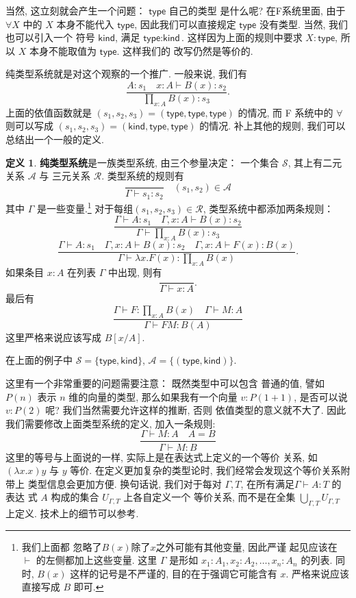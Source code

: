 \documentclass[UTF8]{ctexbook}
\newcommand{\cons}[1]{\textsf{#1}}
\theoremstyle{plain}
\theoremstyle{definition}
\newtheorem{definition}{定义}[chapter]
\theoremstyle{remark}
\begin{document}
当然, 这立刻就会产生一个问题： \(\cons{type}\) 自己的类型
是什么呢? 在F系统里面, 由于 \(\forall X\) 中的 \(X\)
本身不能代入 \(\cons{type}\), 因此我们可以直接规定
\(\cons{type}\) 没有类型. 当然, 我们也可以引入一个
符号 \(\cons{kind}\), 满足 \(\cons{type} : \cons{kind}\).
这样因为上面的规则中要求 \(X : \cons{type}\),
所以 \(X\) 本身不能取值为 \(\cons{type}\). 这样我们的
改写仍然是等价的.

纯类型系统就是对这个观察的一个推广. 一般来说, 我们有
\[\frac{A : s_1 \quad x{:}A \vdash B(x) : s_2}{\prod_{x:A}B(x) : s_3}.\]
上面的依值函数就是 \((s_1,s_2,s_3) = (\cons{type}, \cons{type}, \cons{type})\)
的情况, 而 F 系统中的 \(\forall\) 则可以写成
\((s_1,s_2,s_3) = (\cons{kind}, \cons{type}, \cons{type})\)
的情况. 补上其他的规则, 我们可以总结出一个一般的定义.
\begin{definition}
\textbf{纯类型系统}是一族类型系统, 由三个参量决定：
一个集合 \(\mathcal S\),
其上有二元关系 \(\mathcal A\) 与
三元关系 \(\mathcal R\). 类型系统的规则有
\[\frac{}{\Gamma\vdash s_1 : s_2} \quad (s_1, s_2) \in \mathcal A\]
其中 \(\Gamma\) 是一些变量.\footnote{我们上面都
忽略了\(B(x)\)除了\(x\)之外可能有其他变量, 因此严谨
起见应该在 \(\vdash\) 的左侧都加上这些变量. 这里 \(\Gamma\)
是形如 \(x_1{:}A_1, x_2{:}A_2, \dots, x_n{:}A_n\) 的列表.
同时, \(B(x)\) 这样的记号是不严谨的, 目的在于强调它可能含有 \(x\).
严格来说应该直接写成 \(B\) 即可.}
对于每组\((s_1,s_2,s_3)\in \mathcal R\),
类型系统中都添加两条规则：
\[\frac{\Gamma \vdash A : s_1 \quad \Gamma, x{:}A \vdash B(x) : s_2}{\Gamma \vdash \prod_{x:A} B(x) : s_3}\]
\[\frac{\Gamma \vdash A : s_1 \quad \Gamma, x{:}A \vdash B(x) : s_2\quad
\Gamma, x{:}A \vdash F(x) : B(x)}
{\Gamma \vdash \lambda x. F(x) : \prod_{x:A}B(x)}.\]
如果条目 \(x : A\) 在列表 \(\Gamma\) 中出现, 则有
\[\frac{}{\Gamma \vdash x : A}.\]
最后有
\[\frac{\Gamma \vdash F : \prod_{x:A}B(x) \quad
\Gamma \vdash M : A}{\Gamma \vdash FM : B(A)}\]
这里严格来说应该写成 \(B[x/A]\).
\end{definition}
在上面的例子中 \(\mathcal S = \{\cons{type}, \cons{kind}\}\),
\(\mathcal A = \{(\cons{type}, \cons{kind})\}\).

这里有一个非常重要的问题需要注意： 既然类型中可以包含
普通的值, 譬如 \(P(n)\) 表示 \(n\) 维的向量的类型,
那么如果我有一个向量 \(v : P(1+1)\), 是否可以说
\(v : P(2)\) 呢? 我们当然需要允许这样的推断, 否则
依值类型的意义就不大了. 因此我们需要修改上面类型系统的定义,
加入一条规则:
\[\frac{\Gamma \vdash M : A \quad A = B}{\Gamma \vdash M : B}\]
这里的等号与上面说的一样, 实际上是在表达式上定义的一个等价
关系, 如 \((\lambda x. x)y\) 与 \(y\) 等价.
在定义更加复杂的类型论时, 我们经常会发现这个等价关系附带上
类型信息会更加方便. 换句话说, 我们对于每对 \(\Gamma, T\),
在所有满足\(\Gamma \vdash A : T\) 的表达
式 \(A\) 构成的集合 \(U_{\Gamma, T}\) 上各自定义一个
等价关系, 而不是在全集 \(\bigcup_{\Gamma, T} U_{\Gamma, T}\) 上定义.
技术上的细节可以参考\cite{barendregt:1992:lambda}.
\end{document}
